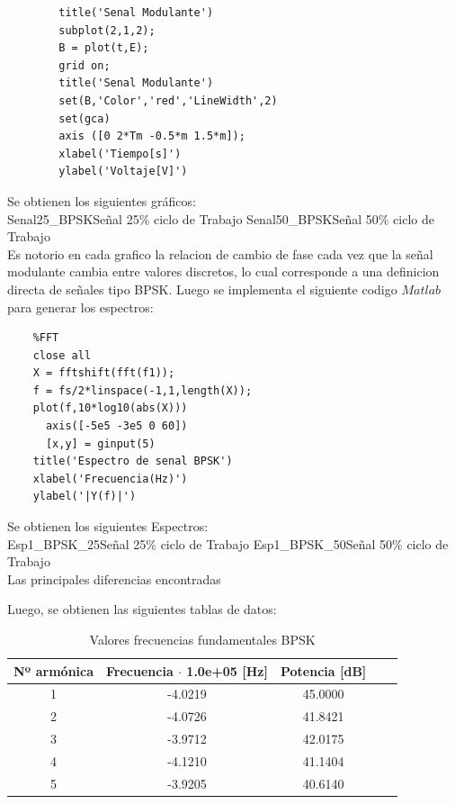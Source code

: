 \documentclass[letterpaper, titlepage]{article}
\begin{document}
\begin{enumerate}
\begin{lstlisting}[label=some-code,caption=Codigo Matlab BPSK]
		%Grafico senal Modulante
		title('Senal Modulante')
		subplot(2,1,2);
		B = plot(t,E);
		grid on;
		title('Senal Modulante')
		set(B,'Color','red','LineWidth',2)
		set(gca)
		axis ([0 2*Tm -0.5*m 1.5*m]);
		xlabel('Tiempo[s]')
		ylabel('Voltaje[V]')
		\end{lstlisting}
	
	Se obtienen los siguientes gráficos:\\
			{Senal25_BPSK}{\label{fig:sim}}{Señal 25\% ciclo de Trabajo}
			{Senal50_BPSK}{\label{fig:sim}}{Señal 50\% ciclo de Trabajo}\\
			Es notorio en cada grafico la relacion de cambio de fase cada vez que la señal modulante cambia entre valores discretos, lo cual corresponde a una definicion directa de señales tipo BPSK.
	\newpage
	Luego se implementa el siguiente codigo $Matlab$ para generar los espectros:
	
	\begin{lstlisting}[label=some-code,caption=Codigo Matlab FFT BPSK]
	%%
	%FFT
	close all
	X = fftshift(fft(f1));
	f = fs/2*linspace(-1,1,length(X));
	plot(f,10*log10(abs(X)))
      axis([-5e5 -3e5 0 60])
      [x,y] = ginput(5)
	title('Espectro de senal BPSK')
	xlabel('Frecuencia(Hz)')
	ylabel('|Y(f)|')
	\end{lstlisting}
	
	Se obtienen los siguientes Espectros:\\
			 {Esp1_BPSK_25}{\label{fig:sim}}{Señal 25\% ciclo de Trabajo}
			 {Esp1_BPSK_50}{\label{fig:sim}}{Señal 50\% ciclo de Trabajo}\\
			 Las principales diferencias encontradas
			 
			 Luego, se obtienen las siguientes tablas de datos:
			 
			\begin{table}[ht]
			\centering
			\begin{tabular}{c c c c c}
				Nº armónica & Frecuencia $\cdot$ 1.0e+05 [Hz] & Potencia [dB]\\
				\hline
				1 & -4.0219 & 45.0000  \\
				2 & -4.0726 & 41.8421   \\
				3 & -3.9712 & 42.0175   \\
				4 & -4.1210 & 41.1404   \\
				5 & -3.9205 & 40.6140  
			\end{tabular}
			\caption{Valores frecuencias fundamentales BPSK}
			\label{tab:tabla1}
		\end{table}
		

\end{enumerate}
\end{document}
